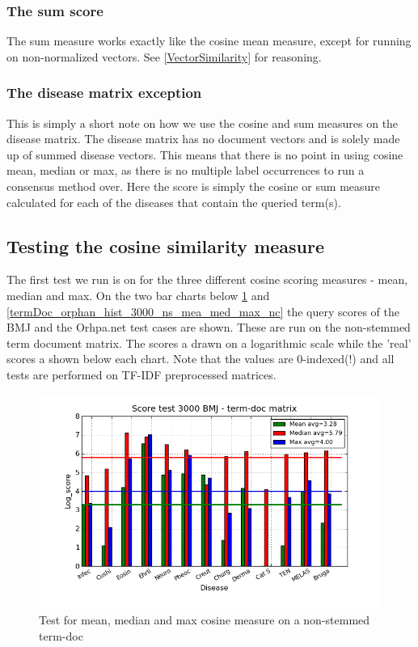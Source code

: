 \subsubsection{The sum score}

The sum measure works exactly like the cosine mean measure, except for
running on non-normalized vectors. See \ref{VectorSimilarity} for
reasoning.

\subsubsection{The disease matrix exception}

This is simply a short note on how we use the cosine and sum measures
on the disease matrix. The disease matrix has no document vectors and
is solely made up of summed disease vectors. This means that there is
no point in using cosine mean, median or max, as there is no multiple
label occurrences to run a consensus method over. Here the score is
simply the cosine or sum measure calculated for each of the diseases
that contain the queried term(s).

\subsection{Testing the cosine similarity measure\label{TestingCosineSimilarity}}

The first test we run is on for the three different cosine scoring
measures - mean, median and max. On the two bar charts below
\ref{termDoc_bmj_hist_3000_ns_mea_med_max_nc} and
\ref{termDoc_orphan_hist_3000_ns_mea_med_max_nc} the query scores of
the BMJ and the Orhpa.net test cases are shown. These are run on the
non-stemmed term document matrix. The scores a drawn on a logarithmic
scale while the 'real' scores a shown below each chart. Note that the
values are 0-indexed(!) and all tests are performed on TF-IDF
preprocessed matrices.

\begin{figure}[H]
  \caption{Test for mean, median and max cosine measure on a non-stemmed term-doc}
  \begin{center}
    \includegraphics[width=1.2\textwidth]{barcharts/termDoc_bmj_hist_3000_ns_mea_med_max_nc.png}
  \end{center}
  \label{termDoc_bmj_hist_3000_ns_mea_med_max_nc}
\end{figure}


